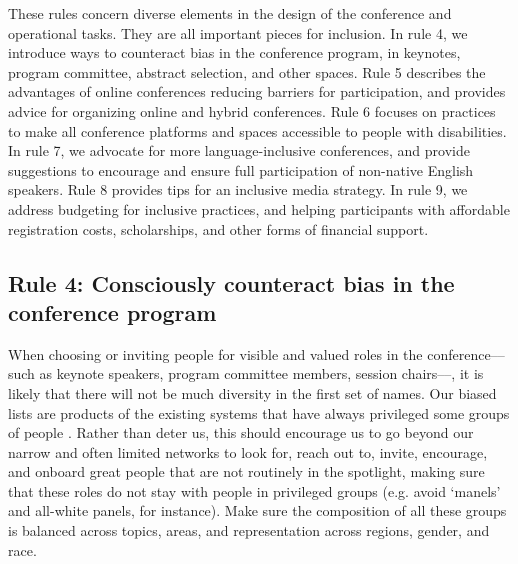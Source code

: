 \documentclass[10pt,letterpaper]{article}
\begin{document}
These rules concern diverse elements in the design of the conference and operational tasks. They are all important pieces for inclusion.
In rule 4, we introduce ways to counteract bias in the conference program, in keynotes, program committee, abstract selection, and other spaces. 
Rule 5 describes the advantages of online conferences reducing barriers for participation, and provides advice for organizing online and hybrid conferences.
Rule 6 focuses on practices to make all conference platforms and spaces accessible to people with disabilities. 
In rule 7, we advocate for more language-inclusive conferences, and provide suggestions to encourage and ensure full participation of non-native English speakers. 
Rule 8 provides tips for an inclusive media strategy. 
In rule 9, we address budgeting for inclusive practices, and helping participants with affordable registration costs, scholarships, and other forms of financial support.


\subsection*{Rule 4: Consciously counteract bias in the conference program}
\label{rule_unbias}

When choosing or inviting people for visible and valued roles in the conference––such as keynote speakers, program committee members, session chairs––, it is likely that there will not be much diversity in the first set of names.
Our biased lists are products of the existing systems that have always privileged some groups of people \cite{dwyerNoticeWhoScience2021,swartzScienceValueDiversity2019,wongBuildDiversityScience2020,dignazioUnicornsJanitorsNinjas2020}. 
Rather than deter us, this should encourage us to go beyond our narrow and often limited networks to look for, reach out to, invite, encourage, and onboard great people that are not routinely in the spotlight, making sure that these roles do not stay with people in privileged groups (e.g. avoid `manels' and all-white panels, for instance).
Make sure the composition of all these groups is balanced across topics, areas, and representation across regions, gender, and race.


\end{document}
